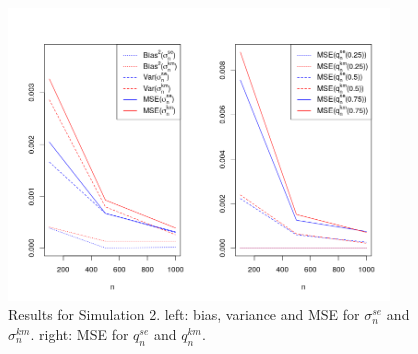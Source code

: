 \begin{figure}[h]
	\begin{center}
		\includegraphics[width=0.9\textwidth]{./figures/weiwei_mse2}
	\end{center}
	\caption{Results for Simulation 2. left: bias, variance and MSE for $\sigma_n^{se}$ and $\sigma_n^{km}$. right: MSE for $q_n^{se}$ and $q_n^{km}$.}
	\label{fig:mse_weiwei}
\end{figure}
%
%
%
